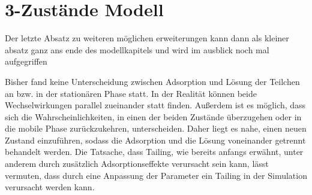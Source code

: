 \section{3-Zustände Modell} 
\label{chapter:mod:3s}


Der letzte Absatz zu weiteren möglichen erweiterungen kann dann als kleiner absatz ganz ans ende des modellkapitels und wird im ausblick noch mal aufgegriffen


Bisher fand keine Unterscheidung zwischen Adsorption und Lösung der Teilchen an bzw. in der stationären Phase statt. In der Realität können beide Wechselwirkungen parallel zueinander statt finden. Außerdem ist es möglich, dass sich die Wahrscheinlichkeiten, in einen der beiden Zustände überzugehen oder in die mobile Phase zurückzukehren, unterscheiden. Daher liegt es nahe, einen neuen Zustand einzuführen, sodass die Adsorption und die Lösung voneinander getrennt behandelt werden. Die Tatsache, dass Tailing, wie bereits anfangs erwähnt, unter anderem durch zusätzlich Adsorptionseffekte verursacht sein kann, lässt vermuten, dass durch eine Anpassung der Parameter ein Tailing in der Simulation verursacht werden kann. 
 
